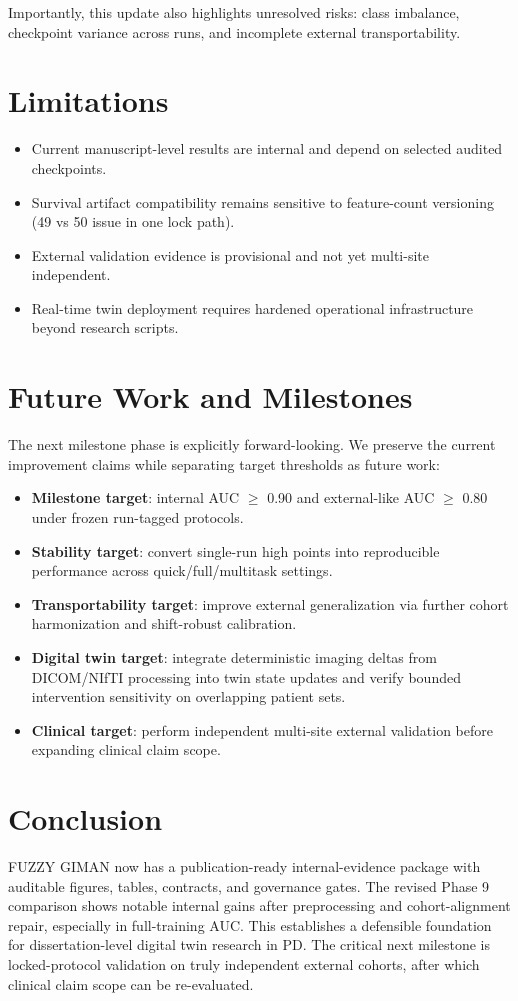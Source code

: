 \documentclass[conference]{IEEEtran}
\begin{document}
Importantly, this update also highlights unresolved risks: class imbalance, checkpoint variance across runs, and incomplete external transportability.

\section{Limitations}
\begin{itemize}
\item Current manuscript-level results are internal and depend on selected audited checkpoints.
\item Survival artifact compatibility remains sensitive to feature-count versioning (49 vs 50 issue in one lock path).
\item External validation evidence is provisional and not yet multi-site independent.
\item Real-time twin deployment requires hardened operational infrastructure beyond research scripts.
\end{itemize}

\section{Future Work and Milestones}
The next milestone phase is explicitly forward-looking. We preserve the current improvement claims while separating target thresholds as future work:
\begin{itemize}
\item \textbf{Milestone target}: internal AUC $\geq$ 0.90 and external-like AUC $\geq$ 0.80 under frozen run-tagged protocols.
\item \textbf{Stability target}: convert single-run high points into reproducible performance across quick/full/multitask settings.
\item \textbf{Transportability target}: improve external generalization via further cohort harmonization and shift-robust calibration.
\item \textbf{Digital twin target}: integrate deterministic imaging deltas from DICOM/NIfTI processing into twin state updates and verify bounded intervention sensitivity on overlapping patient sets.
\item \textbf{Clinical target}: perform independent multi-site external validation before expanding clinical claim scope.
\end{itemize}

\section{Conclusion}
FUZZY GIMAN now has a publication-ready internal-evidence package with auditable figures, tables, contracts, and governance gates. The revised Phase 9 comparison shows notable internal gains after preprocessing and cohort-alignment repair, especially in full-training AUC. This establishes a defensible foundation for dissertation-level digital twin research in PD. The critical next milestone is locked-protocol validation on truly independent external cohorts, after which clinical claim scope can be re-evaluated.
\end{document}
